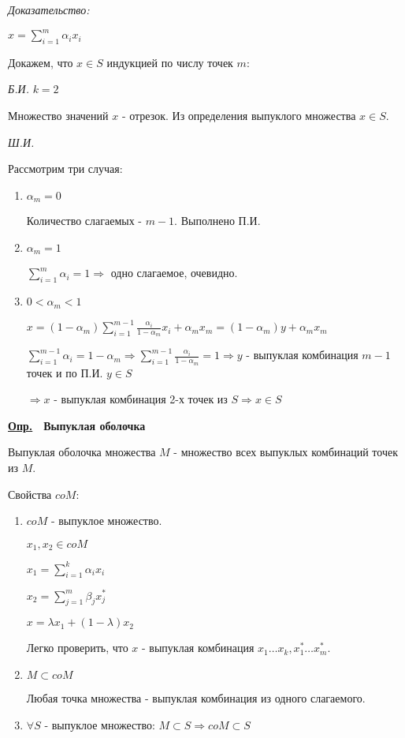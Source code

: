 \documentclass[11pt]{article}
\newenvironment{df}[1]{
  \underline{\textbf{Опр.}}\ \ \textbf{#1}
  
  \begin{adjustwidth}{1em}{}
}{
  \end{adjustwidth}
}
\newenvironment{proof}{
  \textit{Доказательство:}
    
  \begin{adjustwidth}{1em}{}
}{
  \end{adjustwidth}
}
\begin{document}
\begin{sloppypar}
\begin{proof}
  $x = \sum_{i = 1}^m \alpha_i x_i$
  
  Докажем, что $x \in S$ индукцией по числу точек $m$:
  
  \textit{Б.И.} $k = 2$
  
  Множество значений $x$ - отрезок. Из определения выпуклого множества $x \in S$.
  
  \textit{Ш.И.}
  
  Рассмотрим три случая:
  \begin{enumerate}
    \item $\alpha_m = 0$
    
    Количество слагаемых - $m - 1$. Выполнено П.И.
    \item $\alpha_m = 1$
    
    $\sum_{i = 1}^m \alpha_i = 1 \Rightarrow$ одно слагаемое, очевидно.
    \item $0 < \alpha_m < 1$
    
    $x = (1 - \alpha_m) \sum_{i = 1}^{m - 1} \frac{\alpha_i}{1 - \alpha_m} x_i + \alpha_m x_m = (1 - \alpha_m)y + \alpha_m x_m$
    
    $\sum_{i = 1}^{m - 1} \alpha_i = 1 - \alpha_m \Rightarrow \sum_{i = 1}^{m - 1} \frac{\alpha_i}{1 - \alpha_m} = 1 \Rightarrow y$ - выпуклая комбинация $m - 1$ точек и по П.И. $y \in S$
    
    $\Rightarrow x$ - выпуклая комбинация 2-х точек из $S \Rightarrow x \in S$
  \end{enumerate}
\end{proof}

\begin{df}{Выпуклая оболочка}
  Выпуклая оболочка множества $M$ - множество всех выпуклых комбинаций точек из $M$.
\end{df}

Свойства $coM$:
\begin{enumerate}
  \item $coM$ - выпуклое множество.
  
    $x_1, x_2 \in coM$
    
    $x_1 = \sum_{i = 1}^k \alpha_i x_i$
    
    $x_2 = \sum_{j = 1}^m \beta_j x_j^*$
    
    $x = \lambda x_1 + (1 - \lambda)x_2$
    
    Легко проверить, что $x$ - выпуклая комбинация $x_1 \dots x_k, x_1^* \dots x_m^*$.
  \item $M \subset coM$
  
  Любая точка множества - выпуклая комбинация из одного слагаемого.
  \item $\forall S$ - выпуклое множество: $M \subset S \Rightarrow coM \subset S$
  

\end{enumerate}
\end{sloppypar}
\end{document}
